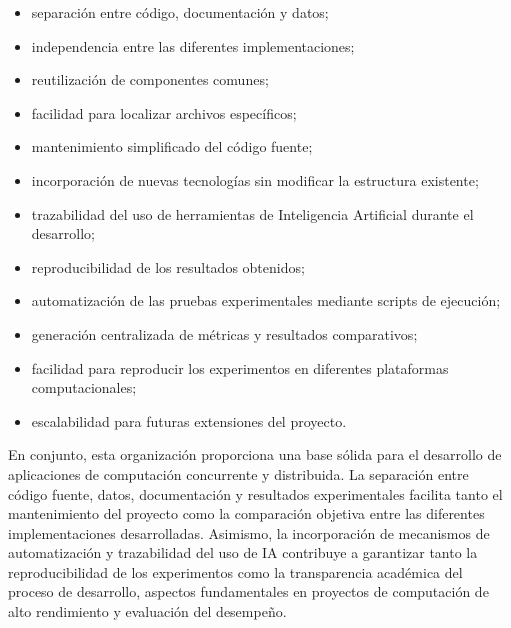 \begin{itemize}

\item separación entre código, documentación y datos;

\item independencia entre las diferentes implementaciones;

\item reutilización de componentes comunes;

\item facilidad para localizar archivos específicos;

\item mantenimiento simplificado del código fuente;

\item incorporación de nuevas tecnologías sin modificar la estructura existente;

\item trazabilidad del uso de herramientas de Inteligencia Artificial durante el desarrollo;

\item reproducibilidad de los resultados obtenidos;

\item automatización de las pruebas experimentales mediante scripts de ejecución;

\item generación centralizada de métricas y resultados comparativos;

\item facilidad para reproducir los experimentos en diferentes plataformas computacionales;

\item escalabilidad para futuras extensiones del proyecto.

\end{itemize}

En conjunto, esta organización proporciona una base sólida para el desarrollo de aplicaciones de computación concurrente y distribuida. La separación entre código fuente, datos, documentación y resultados experimentales facilita tanto el mantenimiento del proyecto como la comparación objetiva entre las diferentes implementaciones desarrolladas. Asimismo, la incorporación de mecanismos de automatización y trazabilidad del uso de IA contribuye a garantizar tanto la reproducibilidad de los experimentos como la transparencia académica del proceso de desarrollo, aspectos fundamentales en proyectos de computación de alto rendimiento y evaluación del desempeño.